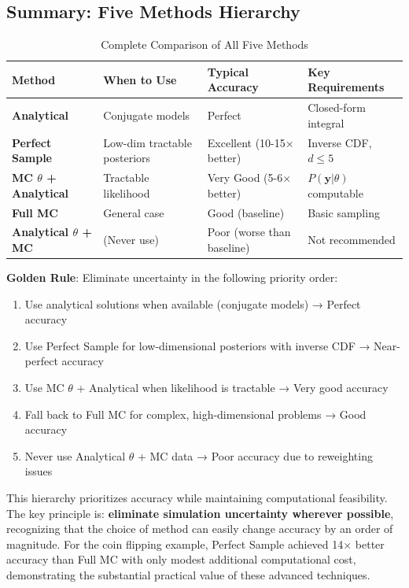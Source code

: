 \subsection{Summary: Five Methods Hierarchy}
\begin{table}[H]
\centering
\caption{Complete Comparison of All Five Methods}
\small
\begin{tabular}{lp{4cm}p{4cm}p{3.5cm}}
\toprule
\textbf{Method} & \textbf{When to Use} & \textbf{Typical Accuracy} & \textbf{Key Requirements} \\
\midrule
\textbf{Analytical} & Conjugate models & Perfect & Closed-form integral \\
\textbf{Perfect Sample} & Low-dim tractable posteriors & Excellent (10-15× better) & Inverse CDF, $d \leq 5$ \\
\textbf{MC $\theta$ + Analytical} & Tractable likelihood & Very Good (5-6× better) & $P(\mathbf{y}|\theta)$ computable \\
\textbf{Full MC} & General case & Good (baseline) & Basic sampling \\
\textbf{Analytical $\theta$ + MC} & (Never use) & Poor (worse than baseline) & Not recommended \\
\bottomrule
\end{tabular}
\end{table}

\textbf{Golden Rule}: Eliminate uncertainty in the following priority order:
\begin{enumerate}
\item Use analytical solutions when available (conjugate models) → Perfect accuracy
\item Use Perfect Sample for low-dimensional posteriors with inverse CDF → Near-perfect accuracy
\item Use MC $\theta$ + Analytical when likelihood is tractable → Very good accuracy
\item Fall back to Full MC for complex, high-dimensional problems → Good accuracy
\item Never use Analytical $\theta$ + MC data → Poor accuracy due to reweighting issues
\end{enumerate}

This hierarchy prioritizes accuracy while maintaining computational feasibility. The key principle is: \textbf{eliminate simulation uncertainty wherever possible}, recognizing that the choice of method can easily change accuracy by an order of magnitude. For the coin flipping example, Perfect Sample achieved 14× better accuracy than Full MC with only modest additional computational cost, demonstrating the substantial practical value of these advanced techniques.

